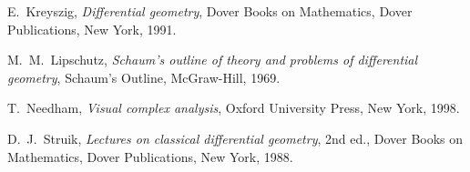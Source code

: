\documentclass[12pt,a4paper,twoside]{article}
\theoremstyle{definition} %
\theoremstyle{plain} %
\theoremstyle{primerstyle}
\numberwithin{equation}{section}  %
\begin{document}
\begin{thebibliography}{10}
E.~Kreyszig, \emph{Differential geometry}, Dover Books on Mathematics, Dover Publications, New York, 1991.

M.~M.~Lipschutz, \emph{Schaum's outline of theory and problems of differential
  geometry}, Schaum's Outline, McGraw-Hill, 1969.

T.~Needham, \emph{Visual complex analysis}, Oxford University Press, New York, 1998.

D.~J.~Struik, \emph{Lectures on classical differential geometry}, 2nd ed., Dover Books on Mathematics, Dover Publications, New York, 1988.

\end{thebibliography}
\end{document}
